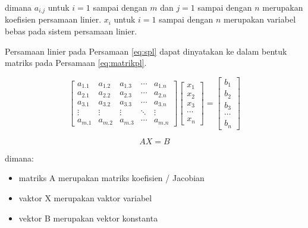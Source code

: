 \documentclass[
]{book}
\providecommand{\tightlist}{%
  \setlength{\itemsep}{0pt}\setlength{\parskip}{0pt}}
\theoremstyle{definition}
\theoremstyle{definition}
\theoremstyle{definition}
\theoremstyle{definition}
\theoremstyle{remark}
\begin{document}
dimana \(a_{i.j}\) untuk \(i=1\) sampai dengan \(m\) dan \(j=1\) sampai dengan \(n\) merupakan koefisien persamaan linier. \(x_i\) untuk \(i=1\) sampai dengan \(n\) merupakan variabel bebas pada sistem persamaan linier.

Persamaan linier pada Persamaan \eqref{eq:spl} dapat dinyatakan ke dalam bentuk matriks pada Persamaan \eqref{eq:matrikpl}.

\begin{equation}
\begin{bmatrix}
     a_{1.1} & a_{1.2} & a_{1.3} &\cdots& a_{1.n}           \\[0.3em]
     a_{2.1} & a_{2.2} & a_{2.3} &\cdots& a_{2.n}           \\[0.3em]
     a_{3.1} & a_{3.2} & a_{3.3} &\cdots& a_{3.n}           \\[0.3em]
     \vdots  & \vdots  & \vdots  &\ddots& \vdots            \\[0.3em]
     a_{m.1} & a_{m.2} & a_{m.3} &\cdots& a_{m.n}
     \end{bmatrix}
\begin{bmatrix}
     x_1                                          \\[0.3em]
     x_2                                          \\[0.3em]
     x_3                                          \\[0.3em]
     \cdots                                       \\[0.3em]
     x_n                                       
     \end{bmatrix}
= \begin{bmatrix}
     b_1                                          \\[0.3em]
     b_2                                          \\[0.3em]
     b_3                                          \\[0.3em]
     \cdots                                       \\[0.3em]
     b_n                                       
     \end{bmatrix}
  \label{eq:matrikpl}
\end{equation}

\begin{equation}
AX=B
  \label{eq:matrikpl2}
\end{equation}

dimana:

\begin{itemize}
\tightlist
\item
  matriks A merupakan matriks koefisien / Jacobian
\item
  vaktor X merupakan vaktor variabel
\item
  vektor B merupakan vektor konstanta
\end{itemize}
\end{document}
